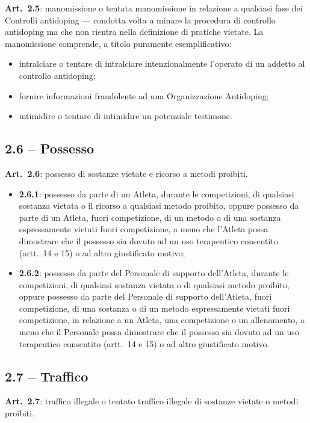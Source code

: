 \textbf{Art.\ 2.5}: manomissione o tentata manomissione in relazione a qualsiasi fase dei
Controlli antidoping --- condotta volta a minare la procedura di controllo antidoping ma che non
rientra nella definizione di pratiche vietate. La manomissione comprende, a titolo puramente
esemplificativo:
\begin{itemize}
  \item intralciare o tentare di intralciare intenzionalmente l'operato di un addetto al
    controllo antidoping;
  \item fornire informazioni fraudolente ad una Organizzazione Antidoping;
  \item intimidire o tentare di intimidire un potenziale testimone.
\end{itemize}

\subsection{2.6 -- Possesso}

\textbf{Art.\ 2.6}: possesso di sostanze vietate e ricorso a metodi proibiti.
\begin{itemize}
  \item \textbf{2.6.1}: possesso da parte di un Atleta, durante le competizioni, di qualsiasi
    sostanza vietata o il ricorso a qualsiasi metodo proibito, oppure possesso da parte di un
    Atleta, fuori competizione, di un metodo o di una sostanza espressamente vietati fuori
    competizione, a meno che l'Atleta possa dimostrare che il possesso sia dovuto ad un uso
    terapeutico consentito (artt.\ 14 e 15) o ad altro giustificato motivo;
  \item \textbf{2.6.2}: possesso da parte del Personale di supporto dell'Atleta, durante le
    competizioni, di qualsiasi sostanza vietata o di qualsiasi metodo proibito, oppure possesso
    da parte del Personale di supporto dell'Atleta, fuori competizione, di una sostanza o di un
    metodo espressamente vietati fuori competizione, in relazione a un Atleta, una competizione o
    un allenamento, a meno che il Personale possa dimostrare che il possesso sia dovuto ad un uso
    terapeutico consentito (artt.\ 14 e 15) o ad altro giustificato motivo.
\end{itemize}

\subsection{2.7 -- Traffico}

\textbf{Art.\ 2.7}: traffico illegale o tentato traffico illegale di sostanze vietate o metodi
proibiti.

